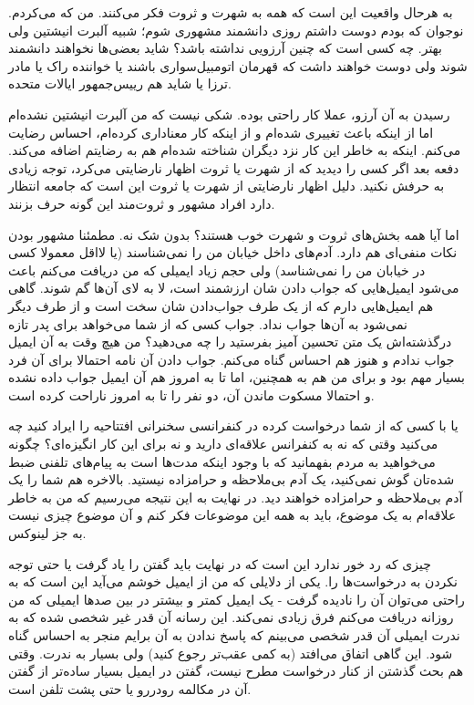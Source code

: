به هرحال واقعیت این است که همه به شهرت و ثروت فکر می‌کنند. من که
می‌کردم. نوجوان که بودم دوست داشتم روزی دانشمند مشهوری شوم؛ شبیه آلبرت
انیشتین ولی بهتر. چه کسی است که چنین آرزویی نداشته باشد؟ شاید بعضی‌ها
نخواهند دانشمند شوند ولی دوست خواهند داشت که قهرمان اتومبیل‌سواری باشند
یا خواننده راک یا مادر ترزا یا شاید هم رییس‌جمهور ایالات متحده.

رسیدن به آن آرزو، عملا کار راحتی بوده. شکی نیست که من آلبرت انیشتین
نشده‌ام اما از اینکه باعث تغییری شده‌ام و از اینکه کار معناداری کرده‌ام،
احساس رضایت می‌کنم. اینکه به خاطر این کار نزد دیگران شناخته‌ شده‌ام هم به
رضایتم اضافه می‌کند.  دفعه بعد اگر کسی را دیدید که از شهرت یا ثروت
اظهار نارضایتی می‌کرد، توجه زیادی به حرفش نکنید. دلیل اظهار نارضایتی از
شهرت یا ثروت این است که جامعه انتظار دارد افراد مشهور و ثروت‌مند این
گونه حرف بزنند.

اما آیا همه بخش‌های ثروت و شهرت خوب هستند؟ بدون شک نه. مطمئنا مشهور
بودن نکات منفی‌ای هم دارد. آدم‌های داخل خیابان من را نمی‌شناسند (یا لااقل
معمولا کسی در خیابان من را نمی‌شناسد) ولی حجم زیاد ایمیلی که من دریافت
می‌کنم باعث می‌شود ایمیل‌هایی که جواب دادن شان ارزشمند است،‌ لا به لای
آن‌ها گم شوند. گاهی هم ایمیل‌هایی دارم که از یک طرف جواب‌دادن شان سخت است
و از طرف دیگر نمی‌شود به آن‌ها جواب نداد. جواب کسی که از شما می‌خواهد
برای پدر تازه درگذشته‌اش یک متن تحسین آمیز بفرستید را چه می‌دهید؟ من هیچ
وقت به آن ایمیل جواب ندادم و هنوز هم احساس گناه می‌کنم. جواب دادن آن
نامه احتمالا برای آن فرد بسیار مهم بود و برای من هم به همچنین، اما تا
به امروز هم آن ایمیل جواب داده نشده و احتمالا مسکوت ماندن آن، دو نفر
را تا به امروز ناراحت کرده است.

یا با کسی که از شما درخواست کرده در کنفرانسی سخنرانی افتتاحیه را ایراد
کنید چه می‌کنید وقتی که نه به کنفرانس علاقه‌ای دارید و نه برای این کار
انگیزه‌ای؟ چگونه می‌خواهید به مردم بفهمانید که با وجود اینکه مدت‌ها است
به پیام‌های تلفنی ضبط شده‌تان گوش نمی‌کنید، یک آدم بی‌ملاحظه و حرامزاده
نیستید. بالاخره هم شما را یک آدم بی‌ملاحظه و حرامزاده خواهند دید. در
نهایت به این نتیجه می‌رسیم که من به خاطر علاقه‌ام به یک موضوع، باید به
همه این موضوعات فکر کنم و آن موضوع چیزی نیست به جز لینوکس.

چیزی که رد خور ندارد این است که در نهایت باید  گفتن را یاد
گرفت یا حتی توجه نکردن به درخواست‌ها را. یکی از دلایلی که من از ایمیل
خوشم می‌آید این است که به راحتی می‌توان آن را نادیده گرفت - یک ایمیل کمتر
و بیشتر در بین صدها ایمیلی که من روزانه دریافت می‌کنم فرق زیادی
نمی‌کند. این رسانه آن قدر غیر شخصی شده که به ندرت ایمیلی آن قدر شخصی
می‌بینم که پاسخ ندادن به آن برایم منجر به احساس گناه شود. این گاهی
اتفاق می‌افتد (به کمی عقب‌تر رجوع کنید) ولی بسیار به ندرت. وقتی هم بحث
گذشتن از کنار درخواست مطرح نیست، گفتن  در ایمیل بسیار
ساده‌تر از گفتن آن در مکالمه رودررو یا حتی پشت تلفن است.

